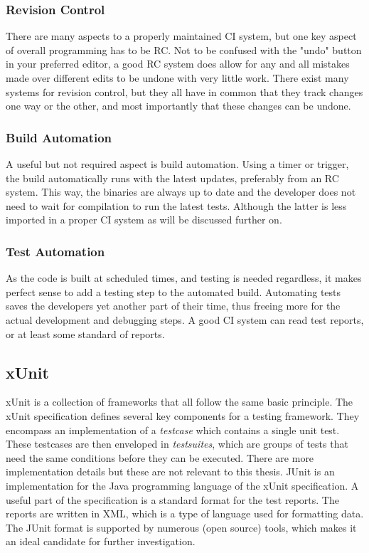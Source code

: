 \documentclass[11pt,british]{article}
\begin{document}
\subsubsection{Revision Control}
There are many aspects to a properly maintained \gls{CI} system, but one key aspect of overall programming has to be \gls{RC}. Not to be confused with the "undo" button in your preferred editor, a good \gls{RC} system does allow for any and all mistakes made over different edits to be undone with very little work. There exist many systems for revision control, but they all have in common that they track changes one way or the other, and most importantly that these changes can be undone. 

\subsubsection{Build Automation}
A useful but not required aspect is build automation. Using a timer or trigger, the build automatically runs with the latest updates, preferably from an \gls{RC} system. This way, the binaries are always up to date and the developer does not need to wait for compilation to run the latest tests. Although the latter is less imported in a proper \gls{CI} system as will be discussed further on. 

\subsubsection{Test Automation}
As the code is built at scheduled times, and testing is needed regardless, it makes perfect sense to add a testing step to the automated build. Automating tests saves the developers yet another part of their time, thus freeing more for the actual development and debugging steps. A good \gls{CI} system can read test reports, or at least some standard of reports. 

\subsection{xUnit}
\label{subsec:xUnit}
xUnit is a collection of frameworks that all follow the same basic principle. The xUnit specification defines several key components for a testing framework. They encompass an implementation of a \emph{testcase} which contains a single unit test. These testcases are then enveloped in \emph{testsuites}, which are groups of tests that need the same conditions before they can be executed.  There are more implementation details but these are not relevant to this thesis. JUnit is an implementation for the Java programming language of the xUnit specification. A useful part of the specification is a standard format for the test reports. The reports are written in \gls{XML}, which is a type of language used for formatting data. The JUnit format is supported by numerous (open source) tools, which makes it an ideal candidate for further investigation.\cite{xunit,junitxml}
\end{document}
